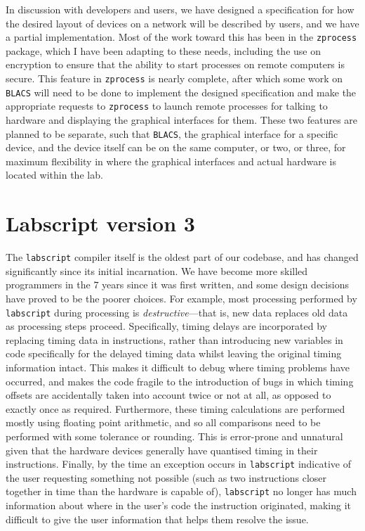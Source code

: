 In discussion with developers and users, we have designed a specification for how the desired layout of devices on a network will be described by users, and we have a partial implementation. Most of the work toward this has been in the \texttt{zprocess} package, which I have been adapting to these needs, including the use on encryption to ensure that the ability to start processes on remote computers is secure. This feature in \texttt{zprocess} is nearly complete, after which some work on \texttt{BLACS} will need to be done to implement the designed specification and make the appropriate requests to \texttt{zprocess} to launch remote processes for talking to hardware and displaying the graphical interfaces for them. These two features are planned to be separate, such that \texttt{BLACS}, the graphical interface for a specific device, and the device itself can be on the same computer, or two, or three, for maximum flexibility in where the graphical interfaces and actual hardware is located within the lab.

\section{Labscript version 3}

The \texttt{labscript} compiler itself is the oldest part of our codebase, and has changed significantly since its initial incarnation. We have become more skilled programmers in the $7$ years since it was first written, and some design decisions have proved to be the poorer choices. For example, most processing performed by \texttt{labscript} during processing is \emph{destructive}---that is, new data replaces old data as processing steps proceed. Specifically, timing delays are incorporated by replacing timing data in instructions, rather than introducing new variables in code specifically for the delayed timing data whilst leaving the original timing information intact. This makes it difficult to debug where timing problems have occurred, and makes the code fragile to the introduction of bugs in which timing offsets are accidentally taken into account twice or not at all, as opposed to exactly once as required. Furthermore, these timing calculations are performed mostly using floating point arithmetic, and so all comparisons need to be performed with some tolerance or rounding. This is error-prone and unnatural given that the hardware devices generally have quantised timing in their instructions. Finally, by the time an exception occurs in \texttt{labscript} indicative of the user requesting something not possible (such as two instructions closer together in time than the hardware is capable of), \texttt{labscript} no longer has much information about where in the user's code the instruction originated, making it difficult to give the user information that helps them resolve the issue.


